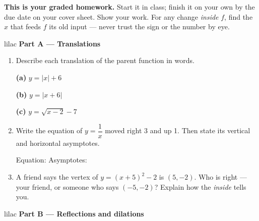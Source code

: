 \documentclass[10pt]{article}
\begin{document}

\vspace{0.12in}

\boxguard[8]
\begin{remindbox}
\small
\textbf{This is your graded homework.} Start it in class; finish it on your own by the due
date on your cover sheet. Show your work. For any change \emph{inside} $f$, find the $x$ that
feeds $f$ its old input --- never trust the sign or the number by eye.
\end{remindbox}

\vspace{0.12in}

\begin{headlinebox}{lilac}
\textbf{\color{plum}Part A --- Translations}
\end{headlinebox}

\begin{enumerate}[leftmargin=1.9em, itemsep=10pt]

\item Describe each translation of the parent function in words.

      \textbf{(a)} $y = |x| + 6$ \qquad \blank{3.6cm}

      \textbf{(b)} $y = |x + 6|$ \qquad \blank{3.6cm}

      \textbf{(c)} $y = \sqrt{x - 2} - 7$ \qquad \blank{3.6cm}

\item Write the equation of $y = \dfrac{1}{x}$ moved right 3 and up 1. Then state its vertical
      and horizontal asymptotes.

      Equation: \blank{3.0cm} \qquad Asymptotes: \blank{3.4cm}

\item A friend says the vertex of $y = (x + 5)^2 - 2$ is $(5, -2)$. Who is right --- your
      friend, or someone who says $(-5, -2)$? Explain how the \emph{inside} tells you.
      \writespace{1.8cm}{}

\end{enumerate}

\vspace{0.1in}

\begin{headlinebox}{lilac}
\textbf{\color{plum}Part B --- Reflections and dilations}
\end{headlinebox}
\end{document}
